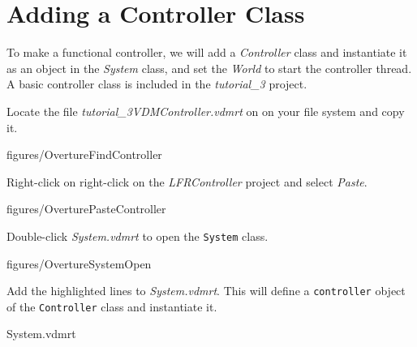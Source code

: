 \documentclass[11pt,a4paper]{../tutorial}
\begin{document}
\newpage
\section{Adding a Controller Class}

To make a functional controller, we will add a \emph{Controller} class and instantiate it as an object in the \emph{System} class, and set the \emph{World} to start the controller thread. A basic controller class is included in the \emph{tutorial\_3} project.

\begin{instructions}
\item Locate the file \emph{tutorial\_3\pathsep{}VDM\pathsep{}Controller.vdmrt} on on your file system and copy it.

    \begin{annotation}[width=0.8\linewidth]{figures/OvertureFindController}
    \end{annotation}

\item Right-click on right-click on the \emph{LFRController} project and select \emph{Paste}.

    \begin{annotation}[width=0.99\linewidth,trim=0 335 0 0,clip]{figures/OverturePasteController}
    \end{annotation}

\item Double-click \emph{System.vdmrt} to open the \texttt{System} class.

    \begin{annotation}[width=0.98\linewidth,trim=0 335 0 0,clip]{figures/OvertureSystemOpen}
    \end{annotation}

\newpage
\item \label{step:system} Add the highlighted lines to \emph{System.vdmrt}. This will define a \texttt{controller} object of the \texttt{Controller} class and instantiate it.

    \bigskip
    
    {System.vdmrt}


\end{instructions}
\end{document}
